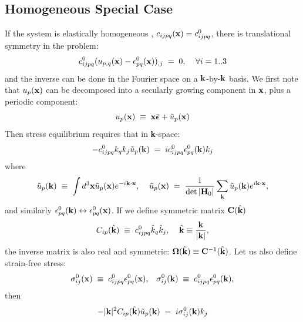 \documentclass[12pt]{article}
\def\bmath#1{\mbox{\boldmath$#1$}}
\begin{document}
\subsection{Homogeneous Special Case}
\label{sec:HomogeneousSpecialCase}

If the system is elastically homogeneous \cite{WangJK02}, 
$c_{ijpq}({\bf x})=c_{ijpq}^0$, there is
translational symmetry in the problem:
\begin{equation}
 c_{ijpq}^0 ( 
  u_{p,q}({\bf x}) - \epsilon^0_{pq}({\bf x}) )_{,j} \;=\; 0, 
  \;\;\;\;
  \forall i=1..3
\end{equation}
and the inverse can be done in the Fourier space on a ${\bf
k}$-by-${\bf k}$ basis.  We first note that $u_p({\bf x})$ can be
decomposed into a secularly growing component in ${\bf x}$, plus a
periodic component:
\begin{equation}
 u_p({\bf x}) \;\equiv\; {\bf x}\bar{\bmath{\epsilon}} + \tilde{u}_p({\bf x})
\end{equation}
Then stress equilibrium requires that in {\bf k}-space:
\begin{equation}
  -c_{ijpq}^0 k_qk_j \tilde{u}_p({\bf k}) \;=\; 
  ic_{ijpq}^0\epsilon^0_{pq}({\bf k}) k_j
\end{equation}
where 
\begin{equation}
 \tilde{u}_p({\bf k}) \;\equiv\; 
 \int d^3{\bf x} \tilde{u}_p({\bf x})e^{-i{\bf k}\cdot {\bf x}},
 \;\;\;\;
 \tilde{u}_p({\bf x}) \;=\; \frac{1}{\det|{\bf H}_0|}
 \sum_{{\bf k}} \tilde{u}_p({\bf k})e^{i{\bf k}\cdot {\bf x}},
\end{equation}
and similarly $\epsilon^0_{pq}({\bf
k})\leftrightarrow\epsilon^0_{pq}({\bf x})$.  If we define 
symmetric matrix ${\bf C}(\hat{\bf k})$
\cite{WangJK02}
\begin{equation}
 C_{ip}(\hat{\bf k}) \;\equiv\; c_{ijpq}^0 \hat{k}_q\hat{k}_j, \;\;\;\;
 \hat{\bf k}\equiv \frac{{\bf k}}{|{\bf k}|},
 \label{C_Definition}
\end{equation}
the inverse matrix is also real and symmetric: ${\bf \Omega}(\hat{\bf k})\equiv
{\bf C}^{-1}(\hat{\bf k})$.  Let us also define strain-free stress:
\begin{equation}
 \sigma^0_{ij}({\bf x}) \;\equiv\; c_{ijpq}^0\epsilon^0_{pq}({\bf x}), \;\;\;
 \sigma^0_{ij}({\bf k}) \;\equiv\; c_{ijpq}^0\epsilon^0_{pq}({\bf k}),
\end{equation}
then
\begin{equation}
 -|{\bf k}|^2 C_{ip}(\hat{\bf k}) \tilde{u}_p({\bf k}) \;=\; 
 i\sigma^0_{ij}({\bf k})k_j
\end{equation}
\end{document}
